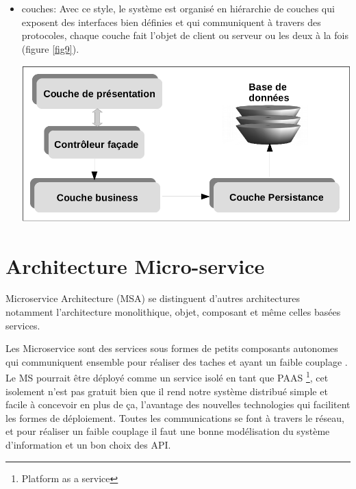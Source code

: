 \documentclass[12pt, a4paper, openany]{report}
\begin{document}
\begin{itemize}
      
      \item  couches: Avec ce style, le système est organisé en hiérarchie de couches qui exposent des interfaces bien définies et qui communiquent à travers des protocoles, chaque couche fait l'objet de client ou serveur ou les deux à la fois (figure \ref{fig9}).
             \begin{center}
               \includegraphics[scale=0.3]{style_couche_9.png}
               \label{fig9}
             \end{center}
             
  \end{itemize}
  
  
\chapter{Architecture Micro-service}
  Microservice Architecture (MSA) se distinguent d'autres architectures notamment l'architecture monolithique, objet, composant et même celles basées services.

    Les Microservice sont des services sous formes de petits composants autonomes qui communiquent ensemble pour réaliser des taches et ayant un faible couplage \cite{refbibFowler} .  \\

    Le MS pourrait être déployé comme un service isolé en tant que PAAS \footnote{Platform as a service}, cet isolement n'est pas gratuit bien que il rend notre système distribué simple et facile à concevoir en plus de ça, l'avantage des nouvelles technologies qui facilitent les formes de déploiement. Toutes les communications se font à travers le réseau, et pour réaliser un faible couplage il faut une bonne modélisation du système d'information et un bon choix des API.
  
\end{document}
